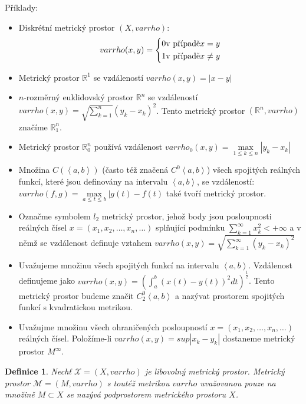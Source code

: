 \documentclass[a4paper, 11pt]{report}
\newtheorem{mydef}{Definice}[chapter]
\begin{document}
Příklady:
\begin{itemize}
	\item Diskrétní metrický prostor $(X, varrho)$:
	$$varrho(x, y) = \begin{dcases}
	0 \text{v případě} x = y\\
	1 \text{v případě} x \not= y
	\end{dcases}$$
	\item Metrický prostor $\mathbb{R}^1$ se vzdáleností $varrho(x, y) = |x-y|$
	\item $n$-rozměrný euklidovský prostor $\mathbb{R}^n$ se vzdáleností $varrho(x, y) = \sqrt{\sum\limits_{k = 1}^n}(y_k - x_k)^2$. Tento metrický prostor $(\mathbb{R}^n, varrho)$ značíme $\mathbb{R}^n_1$.
	\item Metrický prostor $\mathbb{R}^n_0$ používá vzdálenost $varrho_0(x, y) = \max\limits_{1 \leq k \leq n} |y_k - x_k|$
	\item Množina $C(\left<a, b \right>)$ (často též značená $C^0\left<a,b\right>$) všech spojitých reálných funkcí, které jsou definovány na intervalu $\left<a, b\right>$, se vzdáleností: $varrho(f, g) = \max\limits_{a \leq t \leq b} | g(t) - f(t)$ také tvoří metrický prostor.
	\item Označme symbolem $l_2$ metrický prostor, jehož body jsou posloupnosti reálných čísel
	$x = (x_1, x_2, \dots, x_n, \dots)$
	splňující podmínku
	$\sum\limits_{k=1}^\infty x_k^2 < +\infty$
	a v němž se vzdálenost definuje vztahem
	$varrho(x, y) = \sqrt{\sum\limits_{k=1}^\infty(y_k - x_k)^2}$
	\item Uvažujeme množinu všech spojitých funkcí na intervalu $\left<a, b\right>$. Vzdálenost definujeme jako $varrho(x, y) = \left( \int_a^b (x(t) - y(t))^2 dt \right)^\frac{1}{2}$. Tento metrický prostor budeme značit $C_2^0\left<a, b\right>$ a nazývat prostorem spojitých funkcí s kvadratickou metrikou.
	\item Uvažujme množinu všech ohraničených posloupností $x = (x_1, x_2, \dots, x_n, \dots)$ reálných čísel. Položíme-li $varrho(x, y) = sup |x_k - y_k|$ dostaneme metrický prostor $M^\infty$.
\end{itemize}

\begin{mydef}
Nechť $\mathcal{X} = (X, varrho)$ je libovolný metrický prostor. Metrický prostor $\mathcal{M} = (M, varrho)$ s toutéž metrikou $varrho$ uvažovanou pouze na množině $M \subset X$ se nazývá podprostorem metrického prostoru $X$.
\end{mydef}
\end{document}
